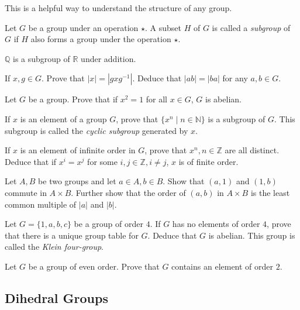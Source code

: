 This is a helpful way to understand the structure of any group.

\begin{definition}
Let $G$ be a group under an operation $\star$. A subset $H$ of $G$ is called a \textit{subgroup} of $G$ if $H$ also forms a group under the operation $\star$.
\end{definition}

\begin{example}
$\mathbb{Q}$ is a subgroup of $\mathbb{R}$ under addition.
\end{example}

\begin{exercise}
    If $x,g\in G$. Prove that $|x|=|gxg^{-1}|$. Deduce that $|ab|=|ba|$ for any $a,b\in G$.
\end{exercise}
\begin{exercise}
    Let $G$ be a group. Prove that if $x^2=1$ for all $x\in G$, $G$ is abelian.
\end{exercise}
\begin{exercise}
    If $x$ is an element of a group $G$, prove that $\{x^n\mid n\in\mathbb{N}\}$ is a subgroup of $G$. This subgroup is called the \textit{cyclic subgroup} generated by $x$.
\end{exercise}
\begin{exercise}
    If $x$ is an element of infinite order in $G$, prove that $x^n, n\in\mathbb{Z}$ are all distinct. Deduce that if $x^i=x^j$ for some $i,j\in\mathbb{Z}, i\neq j$, $x$ is of finite order.
\end{exercise}
\begin{exercise}
    Let $A,B$ be two groups and let $a\in A, b\in B$. Show that $(a,1)$ and $(1,b)$ commute in $A\times B$. Further show that the order of $(a,b)$ in $A\times B$ is the least common multiple of $|a|$ and $|b|$.
\end{exercise}
\begin{exercise}
    Let $G=\{1,a,b,c\}$ be a group of order $4$. If $G$ has no elements of order $4$, prove that there is a unique group table for $G$. Deduce that $G$ is abelian. This group is called the \textit{Klein four-group}.
\end{exercise}

\begin{exercise}
    Let $G$ be a group of even order. Prove that $G$ contains an element of order $2$.
\end{exercise}

\subsection{Dihedral Groups}

